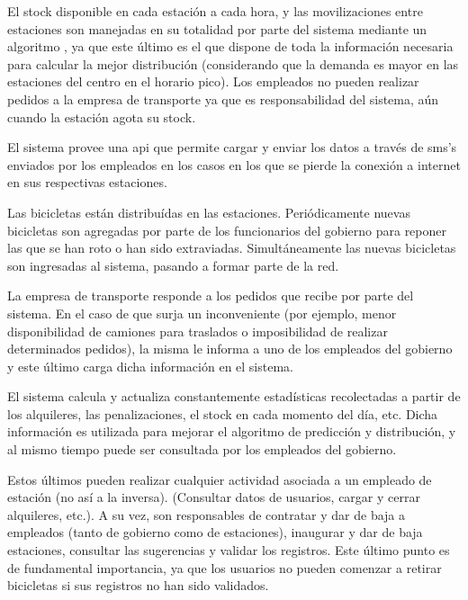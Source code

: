 El stock disponible en cada estación a cada hora, y las movilizaciones entre estaciones son manejadas en su totalidad por parte del sistema mediante un algoritmo
, ya que este último es el que dispone de toda la información necesaria para calcular la mejor distribución (considerando que la demanda es mayor en las estaciones del centro en el horario pico). 
Los empleados no pueden realizar pedidos a la empresa de transporte ya que es responsabilidad del sistema, aún cuando la estación agota su stock.

El sistema provee una api que permite cargar y enviar los datos a través de sms's enviados por los empleados en los casos en los que se pierde la conexión a internet en sus respectivas estaciones. 

Las bicicletas están distribuídas en las estaciones. Periódicamente nuevas bicicletas son agregadas por parte de los funcionarios del gobierno para reponer las que se han roto o han sido extraviadas.
Simultáneamente las nuevas bicicletas son ingresadas al sistema, pasando a formar parte de la red.

La empresa de transporte responde a los pedidos que recibe por parte del sistema. En el caso de que surja un inconveniente (por ejemplo, menor disponibilidad de camiones para traslados o imposibilidad de realizar
determinados pedidos), la misma le informa a uno de los empleados del gobierno y este último carga dicha información en el sistema. 
 
El sistema calcula y actualiza constantemente estadísticas recolectadas a partir de los alquileres, las penalizaciones, el stock en cada momento del día, etc. Dicha información es utilizada para mejorar
el algoritmo de predicción y distribución, y al mismo tiempo puede ser consultada por los empleados del gobierno.

Estos últimos pueden realizar cualquier actividad asociada a un empleado de estación (no así a la inversa). (Consultar datos de usuarios, cargar y cerrar alquileres, etc.). A su vez, son responsables
de contratar y dar de baja a empleados (tanto de gobierno como de estaciones), inaugurar y dar de baja estaciones, consultar las sugerencias y validar los registros. 
Este último punto es de fundamental importancia, ya que los usuarios no pueden comenzar a retirar bicicletas si sus registros no han sido validados. 